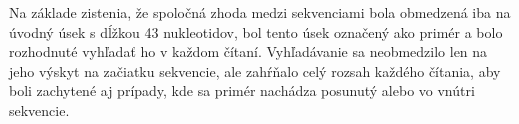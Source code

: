 
Na základe zistenia, že spoločná zhoda medzi sekvenciami bola obmedzená iba
na úvodný úsek s dĺžkou 43 nukleotidov, bol tento úsek označený ako primér
a bolo rozhodnuté vyhľadať ho v každom čítaní. Vyhľadávanie sa neobmedzilo len na jeho
výskyt na začiatku sekvencie, ale zahŕňalo celý rozsah každého čítania,
aby boli zachytené aj prípady, kde sa primér nachádza posunutý alebo vo vnútri
sekvencie.